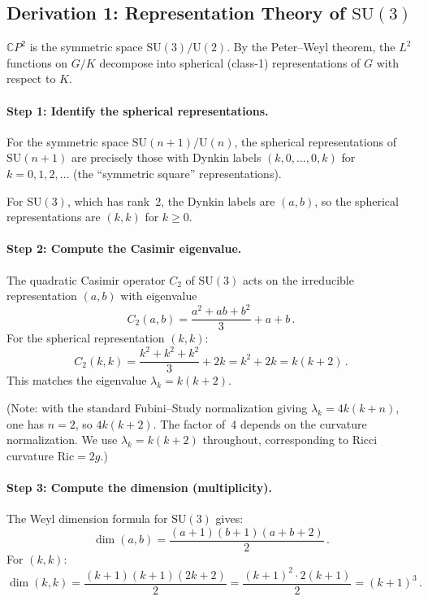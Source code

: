 \documentclass[11pt]{article}
\theoremstyle{remark}
\begin{document}
\subsection{Derivation 1: Representation Theory of $\mathrm{SU}(3)$}

$\mathbb{C}P^2$ is the symmetric space $\mathrm{SU}(3)/\mathrm{U}(2)$.
By the Peter--Weyl theorem, the $L^2$ functions on $G/K$ decompose into
spherical (class-1) representations of $G$ with respect to $K$.

\paragraph{Step 1: Identify the spherical representations.}
For the symmetric space $\mathrm{SU}(n{+}1)/\mathrm{U}(n)$, the spherical
representations of $\mathrm{SU}(n{+}1)$ are precisely those with Dynkin labels
$(k, 0, \ldots, 0, k)$ for $k = 0, 1, 2, \ldots$ (the ``symmetric square''
representations).

For $\mathrm{SU}(3)$, which has rank~2, the Dynkin labels are $(a,b)$, so the
spherical representations are $(k,k)$ for $k \geq 0$.

\paragraph{Step 2: Compute the Casimir eigenvalue.}
The quadratic Casimir operator $C_2$ of $\mathrm{SU}(3)$ acts on the
irreducible representation $(a,b)$ with eigenvalue
\begin{equation}
C_2(a,b) = \frac{a^2 + ab + b^2}{3} + a + b\,.
\end{equation}
For the spherical representation $(k,k)$:
\begin{equation}
C_2(k,k) = \frac{k^2 + k^2 + k^2}{3} + 2k = k^2 + 2k = k(k+2)\,.
\end{equation}
This matches the eigenvalue $\lambda_k = k(k+2)$.

(Note: with the standard Fubini--Study normalization giving
$\lambda_k = 4k(k+n)$, one has $n=2$, so $4k(k+2)$.  The factor of~4
depends on the curvature normalization.  We use $\lambda_k = k(k+2)$
throughout, corresponding to Ricci curvature $\mathrm{Ric} = 2g$.)

\paragraph{Step 3: Compute the dimension (multiplicity).}
The Weyl dimension formula for $\mathrm{SU}(3)$ gives:
\begin{equation}
\dim(a,b) = \frac{(a+1)(b+1)(a+b+2)}{2}\,.
\end{equation}
For $(k,k)$:
\begin{equation}
\dim(k,k) = \frac{(k+1)(k+1)(2k+2)}{2}
           = \frac{(k+1)^2 \cdot 2(k+1)}{2}
           = (k+1)^3\,.
\end{equation}
\end{document}
